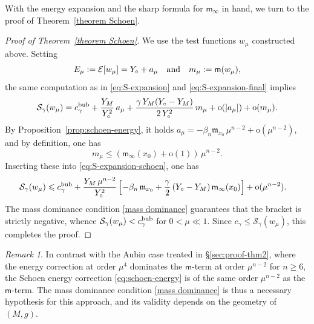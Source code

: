 \documentclass[reqno,11pt]{amsart}
\numberwithin{equation}{section}
\theoremstyle{definition}
\theoremstyle{remark}
\newtheorem{remark}[theorem]{Remark}
\begin{document}
With the energy expansion and the sharp formula for $\mathsf{m}_\infty$ in hand, we turn to the proof of Theorem~\ref{theorem Schoen}.

\begin{proof}[Proof of Theorem~\ref{theorem Schoen}]
We use the test functions $w_\mu$ constructed above. Setting
\[
E_\mu := \mathcal{E}[w_\mu] = Y_\circ + a_\mu \quad {\rm and} \quad m_\mu := \mathsf{m}(w_\mu),
\]
the same computation as in \eqref{eq:S-expansion} and \eqref{eq:S-expansion-final} implies
\begin{equation}\label{eq:S-expansion-schoen}
\mathcal{S}_\gamma(w_\mu) = c_\gamma^{\rm bub} + \frac{Y_M}{Y_\circ^2}\, a_\mu + \frac{\gamma\, Y_M(Y_\circ - Y_M)}{2\, Y_\circ^2}\, m_\mu + \mathrm{o}(|a_\mu|) + \mathrm{o}(m_\mu).
\end{equation}
By Proposition~\ref{prop:schoen-energy}, it holds $a_\mu = -\beta_n \mathfrak{m}_{x_0}\, \mu^{n-2} + \mathrm{o}(\mu^{n-2})$, and by definition, one has 
\[
m_\mu \leqslant (\mathsf{m}_\infty(x_0) + \mathrm{o}(1))\, \mu^{n-2}.
\]
Inserting these into \eqref{eq:S-expansion-schoen}, one has
\begin{align*}
\mathcal{S}_\gamma(w_\mu) &\leqslant c_\gamma^{\rm bub} + \frac{Y_M\, \mu^{n-2}}{Y_\circ^2} \left[-\beta_n\, \mathfrak{m}_{x_0} + \frac{\gamma}{2}\,(Y_\circ - Y_M)\, \mathsf{m}_\infty(x_0)\right] + \mathrm{o}(\mu^{n-2}).
\end{align*}
The mass dominance condition \eqref{mass dominance} guarantees that the bracket is strictly negative, whence $\mathcal{S}_\gamma(w_\mu) < c_\gamma^{\rm bub}$ for $0 < \mu \ll 1$. Since $c_\gamma \leqslant \mathcal{S}_\gamma(w_\mu)$, this completes the proof.
\end{proof}

\begin{remark}
\label{rmk:comparison-yamabe}
In contrast with the Aubin case treated in \S\ref{sec:proof-thm2}, where the energy correction at order $\mu^4$ dominates the $\mathsf{m}$-term at order $\mu^{n-2}$ for $n \geqslant 6$, the Schoen energy correction \eqref{eq:schoen-energy} is of the same order $\mu^{n-2}$ as the $\mathsf{m}$-term. The mass dominance condition \eqref{mass dominance} is thus a necessary hypothesis for this approach, and its validity depends on the geometry of $(M,g)$.
\end{remark}


\appendix
\end{document}
